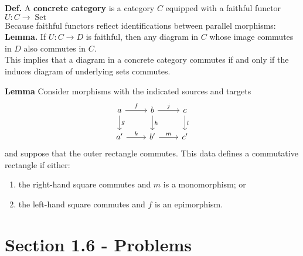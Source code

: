 \documentclass[a4paper]{article}
\theoremstyle{plain}%
\theoremstyle{definition}
\theoremstyle{remark}
\DeclareMathOperator{\Set}{Set}
\begin{document}
\textbf{Def.} A \textbf{concrete category} is a category $C$ equipped with
a faithful functor $U  \colon C \to \Set$\\
\linebreak
Because faithful functors reflect identifications between parallel morphisms:\\
\textbf{Lemma.} If $U  \colon C \to D$ is faithful, then any diagram in $C$
whose image commutes in $D$ also commutes in $C$.\\
\linebreak
This implies that a diagram in a concrete category commutes if and only if the
induces diagram of underlying sets commutes.\\
\linebreak




\textbf{Lemma} Consider morphisms with the indicated sources and targets
\begin{equation*}
\begin{tikzcd}
    a \ar[r,"f"] \ar[d, "g"] & b \ar[d, "h"] \ar[r, "j"] & c \ar[d, "l"]\\
    a' \ar[r, "k"] & b' \ar[r, "m"] & c'
\end{tikzcd}
\end{equation*}
and suppose that the outer rectangle commutes. This data defines a commutative
rectangle if either:
\begin{enumerate}
    \item the right-hand square commutes and $m$ is a monomorphism; or
    \item the left-hand square commutes and $f$ is an epimorphism.
\end{enumerate}


\section*{Section 1.6 - Problems}
\end{document}

